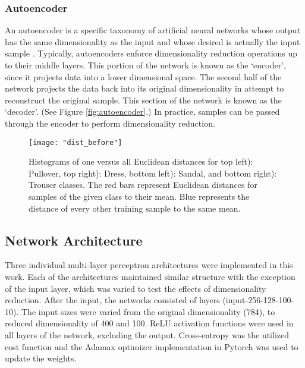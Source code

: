 \documentclass[conference]{IEEEtran}
\begin{document}
	\subsubsection*{Autoencoder} An autoencoder is a specific taxonomy of artificial neural networks whose output has the same dimensionality as the input and whose desired is actually the input sample \cite{Haykin2009NeuralNetworks,Goodfellow2016DeepLearning}. Typically, autoencoders enforce dimensionality reduction operations up to their middle layers.  This portion of the network is known as the `encoder', since it projects data into a lower dimensional space.  The second half of the network projects the data back into its original dimensionality in attempt to reconstruct the original sample.  This section of the network is known as the `decoder'. (See Figure \ref{fig:autoencoder}.)  In practice, samples can be passed through the encoder to perform dimensionality reduction. 
	 
	 \begin{center}
	 	\begin{figure}[t]
	 		\centering
	 		\texttt{[image: "dist\_before"]}
	 		\caption{Histograms of one versus all Euclidean distances for top left): Pullover, top right): Dress, bottom left): Sandal, and bottom right): Trouser classes.  The red bars represent Euclidean distances for samples of the given class to their mean.  Blue represents the distance of every other training sample to the same mean.}
	 		\label{fig:dist_before}
	 	\end{figure}
	 \end{center}
	 
	 
	\subsection{Network Architecture}
	Three individual multi-layer perceptron architectures were implemented in this work.  Each of the architectures maintained similar structure with the exception of the input layer, which was varied to test the effects of dimensionality reduction.  After the input, the networks consisted of layers (input-256-128-100-10). The input sizes were varied from the original dimensionality (784), to reduced dimensionality of 400 and 100.  ReLU activation functions were used in all layers of the network, excluding the output.  Cross-entropy was the utilized cost function and the Adamax optimizer implementation in Pytorch was used to update the weights.	
	
\end{document}
